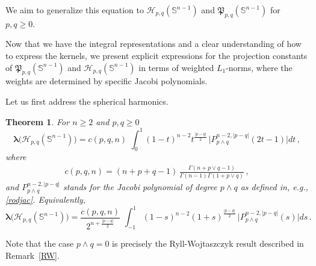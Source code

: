 \documentclass[12pt]{amsart}
\numberwithin{subsection}{section}
\newtheorem{theorem}{Theorem}[section]
\theoremstyle{definition}
\theoremstyle{remark}
\begin{document}
We aim to generalize this equation to  $\mathcal{H}_{p,q}(\mathbb{S}^{n-1}) $ and  $\mathfrak{P}_{p,q}(\mathbb{S}^{n-1}) $ for  $p, q \ge 0 $.

Now that we have the integral representations and a clear understanding of how to express the kernels, we present explicit expressions for the projection constants of $\mathfrak{P}_{p,q}(\mathbb{S}^{n-1})$ and $\mathcal{H}_{p,q}(\mathbb{S}^{n-1})$ in terms of weighted  $ L_1 $-norms, where the weights are determined by specific Jacobi polynomials.


Let us first address the spherical harmonics.

\begin{theorem} \label{jacobi}
   For    $n \geq 2 $
 and  $p,q \geq 0 $
\begin{equation*}
  \boldsymbol{\lambda}\big(\mathcal{H}_{p,q}(\mathbb{S}^{n-1})\big)
  = c(p,q,n)\,\, \int_{0}^{1} (1-t)^{n-2} t^{\frac{|p-q|}{2}} \,\big| P_{p\wedge q}^{n-2,|p-q|}(2t -1)\big| dt\,,
\end{equation*}
where
\begin{align*}
  c(p,q,n)
    =
   (n+p+q-1)\,
  \frac{\Gamma(n+ p \vee q -1)}{ \Gamma(n-1) \Gamma(1+ p \vee q)}\,,
\end{align*}
and $P_{p\wedge q}^{n-2,|p-q|}$ stands for the Jacobi polynomial of degree $p\wedge q$ as defined in, e.g., \eqref{rodjac}.
Equivalently,
\begin{equation*}
  \boldsymbol{\lambda}\big(\mathcal{H}_{p,q}(\mathbb{S}^{n-1})\big)
  = \frac{c(p,q,n)}{2^{n + \frac{|p-q|}{2}}}\,\, \int_{-1}^{1} (1-s)^{n-2} (1+s)^{\frac{|p-q|}{2}} \,\big| P_{p\wedge q}^{n-2,|p-q|}(s)\big| ds\,.
\end{equation*}
  \end{theorem}



Note that the case  $p \wedge q= 0 $ is precisely the Ryll-Wojtaszczyk result  described in Remark~\ref{RW}.
\end{document}
